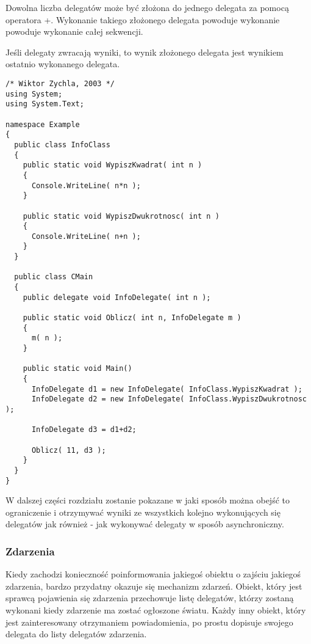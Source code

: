 Dowolna liczba delegatów może być złożona do jednego delegata za pomocą operatora +. 
Wykonanie takiego złożonego delegata powoduje wykonanie powoduje wykonanie całej sekwencji. 

Jeśli delegaty zwracają wyniki, to wynik złożonego delegata jest wynikiem
ostatnio wykonanego delegata.

\begin{scriptsize}
\begin{verbatim}
/* Wiktor Zychla, 2003 */
using System;
using System.Text;

namespace Example
{ 
  public class InfoClass
  {
  	public static void WypiszKwadrat( int n )
  	{
  	  Console.WriteLine( n*n );
  	}
  	
  	public static void WypiszDwukrotnosc( int n )
  	{
  	  Console.WriteLine( n+n );
  	}
  }
	
  public class CMain
  {    
  	public delegate void InfoDelegate( int n );
  	
  	public static void Oblicz( int n, InfoDelegate m )
  	{
  	  m( n );
  	}
  	
    public static void Main()
    {
      InfoDelegate d1 = new InfoDelegate( InfoClass.WypiszKwadrat );
      InfoDelegate d2 = new InfoDelegate( InfoClass.WypiszDwukrotnosc );

      InfoDelegate d3 = d1+d2;

      Oblicz( 11, d3 );    	    	
    }
  }
}
\end{verbatim}
\end{scriptsize}

W dalszej części rozdziału zostanie pokazane w jaki sposób można obejść to ograniczenie i otrzymywać
wyniki ze wszystkich kolejno wykonujących się delegatów jak również - jak wykonywać delegaty w sposób asynchroniczny.

\subsubsection{Zdarzenia}

Kiedy zachodzi konieczność poinformowania jakiegoś obiektu o zajściu jakiegoś zdarzenia, bardzo przydatny
okazuje się mechanizm zdarzeń. Obiekt, który jest sprawcą pojawienia się zdarzenia przechowuje listę
delegatów, którzy zostaną wykonani kiedy zdarzenie ma zostać ogłoszone światu. Każdy inny obiekt, który
jest zainteresowany otrzymaniem powiadomienia, po prostu dopisuje swojego delegata do listy delegatów
zdarzenia.

